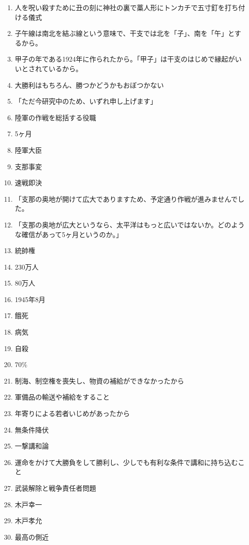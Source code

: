 \documentclass[]{jsarticle}
\begin{document}
\begin{enumerate}
	\item 人を呪い殺すために丑の刻に神社の裏で藁人形にトンカチで五寸釘を打ち付ける儀式
	\item 子午線は南北を結ぶ線という意味で、干支では北を「子」、南を「午」とするから。
	\item 甲子の年である1924年に作られたから。「甲子」は干支のはじめで縁起がいいとされているから。
		\\
	\item 大勝利はもちろん、勝つかどうかもおぼつかない
	\item 「ただ今研究中のため、いずれ申し上げます」
	\item 陸軍の作戦を総括する役職
	\item 5ヶ月
	\item 陸軍大臣
	\item 支那事変
	\item 速戦即決
	\item 「支那の奥地が開けて広大でありますため、予定通り作戦が進みませんでした。
	\item 「支那の奥地が広大というなら、太平洋はもっと広いではないか。どのような確信があって5ヶ月というのか。」
	\item 統帥権
	\item 230万人
	\item 80万人
	\item 1945年8月
	\item 餓死
	\item 病気
	\item 自殺
	\item 70\%
	\item 制海、制空権を喪失し、物資の補給ができなかったから
	\item 軍備品の輸送や補給をすること
	\item 年寄りによる若者いじめがあったから
		\\
	\item 無条件降伏
	\item 一撃講和論
	\item 運命をかけて大勝負をして勝利し、少しでも有利な条件で講和に持ち込むこと
		\\
	\item 武装解除と戦争責任者問題
	\item 木戸幸一
	\item 木戸孝允
	\item 最高の側近
\end{enumerate}
\end{document}
